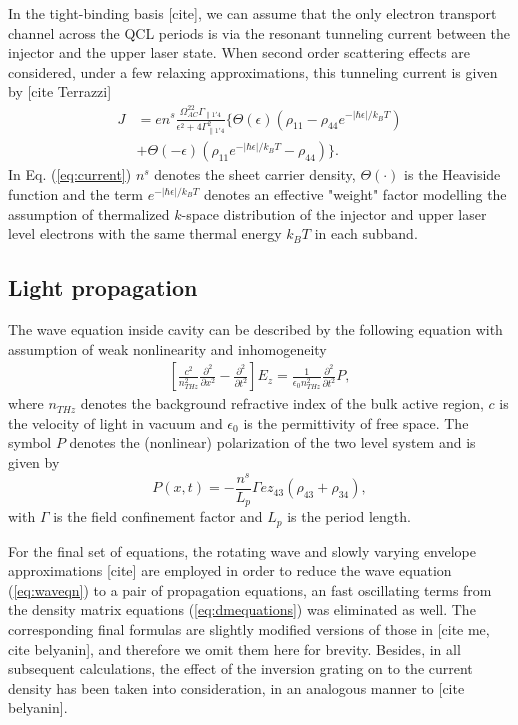 \documentclass[11pt,final]{scrbook}
\def\p{\partial}
\begin{document}
In the tight-binding basis [cite], we can assume that the only electron transport channel across the QCL periods is via the resonant tunneling current between the injector and the upper laser state. When second order scattering effects are considered, under a few relaxing approximations, this tunneling current is given by [cite Terrazzi]
\begin{align}
\label{eq:current}
J &= en^s\frac{\Omega_{AC}^22\Gamma_{\parallel 1'4}}{\epsilon^2+4\Gamma_{\parallel 1'4}^2}\Big\{\Theta(\epsilon)(\rho_{11}-\rho_{44}e^{-|\hbar\epsilon|/k_BT}) \nonumber \\
&+\Theta(-\epsilon)(\rho_{11}e^{-|\hbar\epsilon|/k_BT}-\rho_{44})\Big\}.
\end{align}
In Eq. (\ref{eq:current}) $n^s$ denotes the sheet carrier density, $\Theta(\cdot)$ is the Heaviside function and the term $e^{-|\hbar\epsilon|/k_BT}$ denotes an effective "weight" factor modelling the assumption of thermalized $k$-space distribution of the injector and upper laser level electrons with the same thermal energy $k_BT$ in each subband.   

\subsection{Light propagation}
The wave equation inside cavity can be described by the following equation with assumption of weak nonlinearity and inhomogeneity
\begin{align}
\label{eq:waveqn}
\left [\frac{c^2}{n_{THz}^2} \frac{\p^2}{\p x^2} -\frac{\p^2}{\p t^2} \right ] E_z =\frac{1}{\epsilon_0 n_{THz}^2}\frac{\p^2}{\p t^2}P,
\end{align}
where  $n_{THz}$ denotes the background refractive index of the bulk active region, $c$ is the velocity of light in vacuum and $\epsilon_0$ is the permittivity of free space. The symbol $P$ denotes the (nonlinear) polarization of the two level system and is given by 
\begin{equation}
P(x,t) =  -\frac{n^s}{L_p}\Gamma ez_{43} (\rho_{43}+\rho_{34}),  
\end{equation}
with $\Gamma$ is the field confinement factor and $L_p$ is the period length. 

For the final set of equations, the rotating wave and slowly varying envelope approximations [cite] are employed in order to reduce the wave equation (\ref{eq:waveqn}) to a pair of propagation equations, an fast oscillating terms from the density matrix equations (\ref{eq:dmequations}) was eliminated as well. The corresponding final formulas are slightly modified versions of those in [cite me, cite belyanin], and therefore we omit them here for brevity. Besides, in all subsequent calculations, the effect of the inversion grating on to the current density has been taken into consideration, in an analogous manner to [cite belyanin]. 
\end{document}
